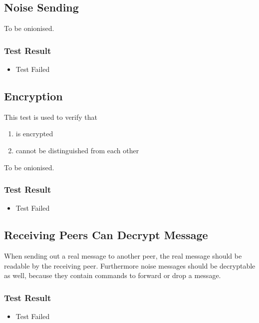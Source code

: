 \subsection{Noise Sending}

To be onionised.


\subsubsection{Test Result}
\begin{itemize}
\item Test Failed
\end{itemize}
\subsection{Encryption}
This test is used to verify that
\begin{enumerate}
\item is encrypted
\item cannot be distinguished from each other
\end{enumerate}

To be onionised.

\subsubsection{Test Result}
\begin{itemize}
\item Test Failed
\end{itemize}
\subsection{Receiving Peers Can Decrypt Message}
When sending out a real message to another peer, the real message should
be readable by the receiving peer. Furthermore noise messages should be
decryptable as well, because they contain commands to forward or drop a message.

\subsubsection{Test Result}
\begin{itemize}
\item Test Failed
\end{itemize}
